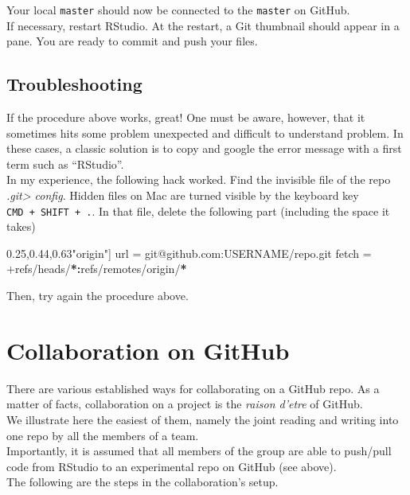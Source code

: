 \documentclass[]{book}
\newenvironment{Shaded}{}{}
\newcommand{\ErrorTok}[1]{\textcolor[rgb]{1.00,0.00,0.00}{\textbf{#1}}}
\newcommand{\NormalTok}[1]{#1}
\newcommand{\OperatorTok}[1]{\textcolor[rgb]{0.40,0.40,0.40}{#1}}
\newcommand{\StringTok}[1]{\textcolor[rgb]{0.25,0.44,0.63}{#1}}
\theoremstyle{definition}
\theoremstyle{definition}
\theoremstyle{definition}
\theoremstyle{remark}
\begin{document}
Your local \texttt{master} should now be connected to the
\texttt{master} on GitHub.\\
If necessary, restart RStudio. At the restart, a Git thumbnail should
appear in a pane. You are ready to commit and push your files.

\hypertarget{troubleshooting}{%
\subsection{Troubleshooting}\label{troubleshooting}}

If the procedure above works, great! One must be aware, however, that it
sometimes hits some problem unexpected and difficult to understand
problem. In these cases, a classic solution is to copy and google the
error message with a first term such as ``RStudio''.\\
In my experience, the following hack worked. Find the invisible file of
the repo \emph{.git\textgreater{} config}. Hidden files on Mac are
turned visible by the keyboard key \texttt{CMD\ +\ SHIFT\ +\ .}. In that
file, delete the following part (including the space it takes)

\begin{Shaded}
\begin{Highlighting}[]
\NormalTok{[remote }\StringTok{"origin"}\NormalTok{]}
\NormalTok{    url =}\StringTok{ }\NormalTok{git}\OperatorTok{@}\NormalTok{github.com}\OperatorTok{:}\NormalTok{USERNAME}\OperatorTok{/}\NormalTok{repo.git}
\NormalTok{    fetch =}\StringTok{ }\OperatorTok{+}\NormalTok{refs}\OperatorTok{/}\NormalTok{heads}\OperatorTok{/}\ErrorTok{*:}\NormalTok{refs}\OperatorTok{/}\NormalTok{remotes}\OperatorTok{/}\NormalTok{origin}\OperatorTok{/}\ErrorTok{*}
\end{Highlighting}
\end{Shaded}

Then, try again the procedure above.

\hypertarget{collaboration-on-github}{%
\section{Collaboration on GitHub}\label{collaboration-on-github}}

There are various established ways for collaborating on a GitHub repo.
As a matter of facts, collaboration on a project is the \emph{raison
d'etre} of GitHub.\\
We illustrate here the easiest of them, namely the joint reading and
writing into one repo by all the members of a team.\\
Importantly, it is assumed that all members of the group are able to
push/pull code from RStudio to an experimental repo on GitHub (see
above).\\
The following are the steps in the collaboration's setup.
\end{document}
